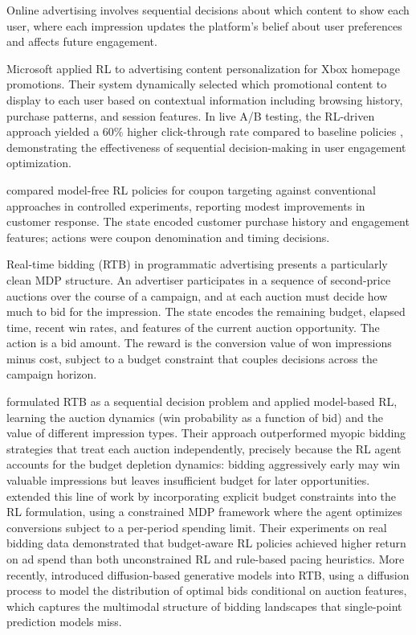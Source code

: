 Online advertising involves sequential decisions about which content to show each user, where each impression updates the platform's belief about user preferences and affects future engagement.

Microsoft applied RL to advertising content personalization for Xbox homepage promotions. Their system dynamically selected which promotional content to display to each user based on contextual information including browsing history, purchase patterns, and session features. In live A/B testing, the RL-driven approach yielded a $60\%$ higher click-through rate compared to baseline policies \citep{Microsoft2022}, demonstrating the effectiveness of sequential decision-making in user engagement optimization.

\citet{Liu2022} compared model-free RL policies for coupon targeting against conventional approaches in controlled experiments, reporting modest improvements in customer response. The state encoded customer purchase history and engagement features; actions were coupon denomination and timing decisions.

Real-time bidding (RTB) in programmatic advertising presents a particularly clean MDP structure. An advertiser participates in a sequence of second-price auctions over the course of a campaign, and at each auction must decide how much to bid for the impression. The state encodes the remaining budget, elapsed time, recent win rates, and features of the current auction opportunity. The action is a bid amount. The reward is the conversion value of won impressions minus cost, subject to a budget constraint that couples decisions across the campaign horizon.

\citet{Cai2017rtb} formulated RTB as a sequential decision problem and applied model-based RL, learning the auction dynamics (win probability as a function of bid) and the value of different impression types. Their approach outperformed myopic bidding strategies that treat each auction independently, precisely because the RL agent accounts for the budget depletion dynamics: bidding aggressively early may win valuable impressions but leaves insufficient budget for later opportunities. \citet{Wu2018budgetbidding} extended this line of work by incorporating explicit budget constraints into the RL formulation, using a constrained MDP framework where the agent optimizes conversions subject to a per-period spending limit. Their experiments on real bidding data demonstrated that budget-aware RL policies achieved higher return on ad spend than both unconstrained RL and rule-based pacing heuristics. More recently, \citet{Guo2024diffbid} introduced diffusion-based generative models into RTB, using a diffusion process to model the distribution of optimal bids conditional on auction features, which captures the multimodal structure of bidding landscapes that single-point prediction models miss.

